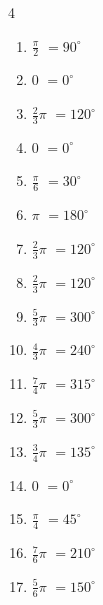 \begin{multicols}{4}
\begin{enumerate}
  \item $\displaystyle \frac{\pi}{2}$
        $\displaystyle =90^{\circ}$

  \item $\displaystyle 0$
        $\displaystyle =0^{\circ}$

  \item $\displaystyle \frac{2}{3}\pi$
        $\displaystyle =120^{\circ}$

  \item $\displaystyle 0$
        $\displaystyle =0^{\circ}$

  \item $\displaystyle \frac{\pi}{6}$
        $\displaystyle =30^{\circ}$

  \item $\displaystyle \pi$
        $\displaystyle =180^{\circ}$

  \item $\displaystyle \frac{2}{3}\pi$
        $\displaystyle =120^{\circ}$

  \item $\displaystyle \frac{2}{3}\pi$
        $\displaystyle =120^{\circ}$

  \item $\displaystyle \frac{5}{3}\pi$
        $\displaystyle =300^{\circ}$

  \item $\displaystyle \frac{4}{3}\pi$
        $\displaystyle =240^{\circ}$

  \item $\displaystyle \frac{7}{4}\pi$
        $\displaystyle =315^{\circ}$

  \item $\displaystyle \frac{5}{3}\pi$
        $\displaystyle =300^{\circ}$

  \item $\displaystyle \frac{3}{4}\pi$
        $\displaystyle =135^{\circ}$

  \item $\displaystyle 0$
        $\displaystyle =0^{\circ}$

  \item $\displaystyle \frac{\pi}{4}$
        $\displaystyle =45^{\circ}$

  \item $\displaystyle \frac{7}{6}\pi$
        $\displaystyle =210^{\circ}$

  \item $\displaystyle \frac{5}{6}\pi$
        $\displaystyle =150^{\circ}$


\end{enumerate}
\end{multicols}
